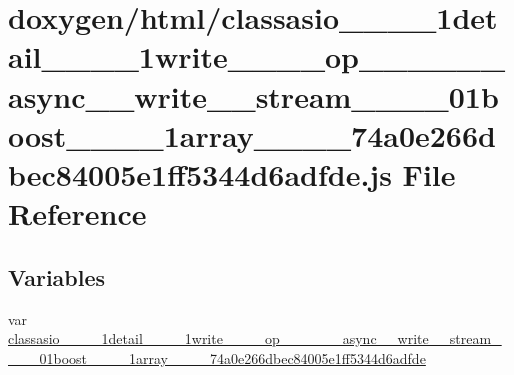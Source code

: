 \hypertarget{classasio____1____1detail____1____1write________op____3____01____async____write____stream____00_90909a2cb7f5d39d792da4dbaf0ee177}{}\section{doxygen/html/classasio\+\_\+\+\_\+\_\+\+\_\+1detail\+\_\+\+\_\+\_\+\+\_\+1write\+\_\+\+\_\+\+\_\+\+\_\+op\+\_\+\+\_\+\_\+\+\_\+\_\+\+\_\+async\+\_\+\+\_\+write\+\_\+\+\_\+stream\+\_\+\+\_\+\_\+\+\_\+01boost\+\_\+\+\_\+\_\+\+\_\+1array\+\_\+\+\_\+\_\+\+\_\+74a0e266dbec84005e1ff5344d6adfde.js File Reference}
\label{classasio____1____1detail____1____1write________op____3____01____async____write____stream____00_90909a2cb7f5d39d792da4dbaf0ee177}
\subsection*{Variables}
\begin{DoxyCompactItemize}
\item 
var \hyperlink{classasio____1____1detail____1____1write________op____3____01____async____write____stream____00_90909a2cb7f5d39d792da4dbaf0ee177_a12275d2d3a5138867265f451c16af93c}{classasio\+\_\+\+\_\+\_\+\+\_\+1detail\+\_\+\+\_\+\_\+\+\_\+1write\+\_\+\+\_\+\+\_\+\+\_\+op\+\_\+\+\_\+\_\+\+\_\+\_\+\+\_\+async\+\_\+\+\_\+write\+\_\+\+\_\+stream\+\_\+\+\_\+\_\+\+\_\+01boost\+\_\+\+\_\+\_\+\+\_\+1array\+\_\+\+\_\+\_\+\+\_\+74a0e266dbec84005e1ff5344d6adfde}
\end{DoxyCompactItemize}


